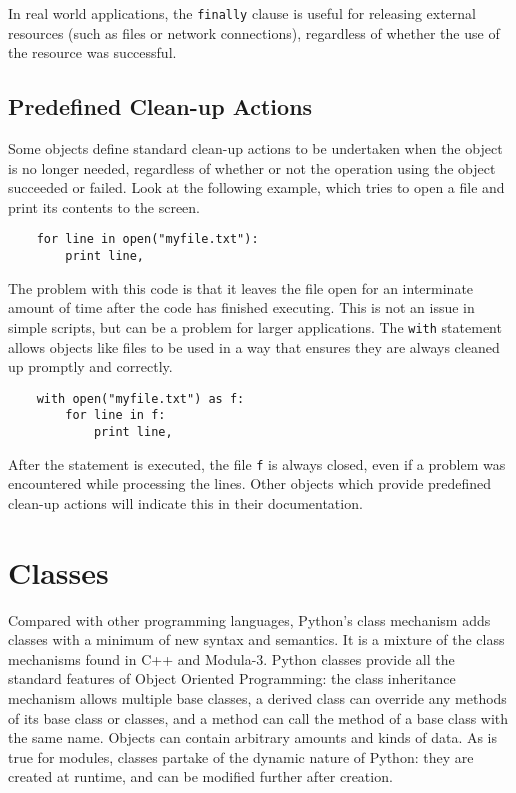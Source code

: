 \documentclass[UTF8]{article}
\begin{document}
In real world applications, the \texttt{finally} clause is useful for releasing external resources
(such as files or network connections), regardless of whether the use of the resource was
successful.

\subsection{Predefined Clean-up Actions}
Some objects define standard clean-up actions to be undertaken when the object is no longer needed,
regardless of whether or not the operation using the object succeeded or failed. Look at the
following example, which tries to open a file and print its contents to the screen.
\begin{verbatim}
    for line in open("myfile.txt"):
        print line,
\end{verbatim}

The problem with this code is that it leaves the file open for an interminate amount of time after
the code has finished executing. This is not an issue in simple scripts, but can be a problem for
larger applications. The \texttt{with} statement allows objects like files to be used in a way that
ensures they are always cleaned up promptly and correctly.
\begin{verbatim}
    with open("myfile.txt") as f:
        for line in f:
            print line,
\end{verbatim}

After the statement is executed, the file \texttt{f} is always closed, even if a problem was
encountered while processing the lines. Other objects which provide predefined clean-up actions
will indicate this in their documentation.

\section{Classes}
Compared with other programming languages, Python's class mechanism adds classes with a minimum of
new syntax and semantics. It is a mixture of the class mechanisms found in C++ and Modula-3. Python
classes provide all the standard features of Object Oriented Programming: the class inheritance
mechanism allows multiple base classes, a derived class can override any methods of its base class
or classes, and a method can call the method of a base class with the same name. Objects can
contain arbitrary amounts and kinds of data. As is true for modules, classes partake of the dynamic
nature of Python: they are created at runtime, and can be modified further after creation.
\end{document}
